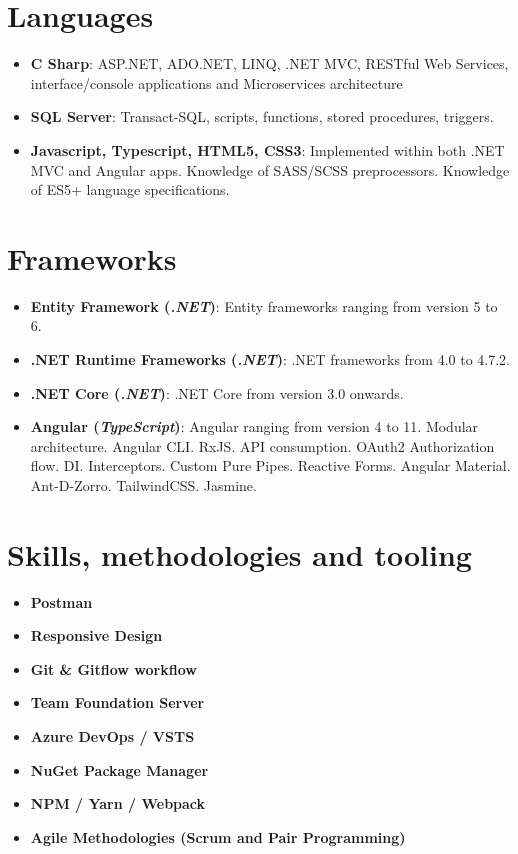\documentclass[letterpaper,11pt]{article}
\newcommand{\resumeItem}[2]{
  \item\small{
    \textbf{#1}{: #2 \vspace{-2pt}}
  }
}
\newcommand{\resumeItemItalic}[3]{
  \item\small{
    \textbf{#1 (\textit{#2})}{: #3 \vspace{-2pt}}
  }\vspace{-4pt}
}
\newcommand{\resumeItemAlign}[2]{
  \vspace{-1pt}\item\small{
    \textbf{#1} \hfill \textit{#2}
  }\vspace{-5pt}
}
\newcommand{\resumeSubHeadingListStart}{\begin{itemize}[leftmargin=*]}
\newcommand{\resumeSubHeadingListEnd}{\end{itemize}}
\begin{document}
\section{Languages}
\resumeSubHeadingListStart	
	\resumeItem{C Sharp} 
	{ASP.NET, ADO.NET, LINQ, .NET MVC, RESTful Web Services, interface/console applications and Microservices architecture}\\
	\resumeItem{SQL Server} 
	{Transact-SQL, scripts, functions, stored procedures, triggers.}\\
	\resumeItem{Javascript, Typescript, HTML5, CSS3}{Implemented within both .NET MVC and Angular apps. Knowledge of SASS/SCSS preprocessors. Knowledge of ES5+ language specifications.}
\resumeSubHeadingListEnd


\section{Frameworks}
\resumeSubHeadingListStart
  \resumeItemItalic{Entity Framework} {.NET}
    {Entity frameworks ranging from version 5 to 6.}
  \resumeItemItalic{.NET Runtime Frameworks}{.NET}
    {.NET frameworks from 4.0 to 4.7.2.}
\resumeItemItalic{.NET Core}{.NET}
    {.NET Core from version 3.0 onwards.}
  \resumeItemItalic{Angular}{TypeScript}
    {Angular ranging from version 4 to 11. Modular architecture. Angular CLI. RxJS. API consumption. OAuth2 Authorization flow. DI. Interceptors. Custom Pure Pipes. Reactive Forms.  Angular Material. Ant-D-Zorro. TailwindCSS. Jasmine.}
\resumeSubHeadingListEnd


\section{Skills,  methodologies and tooling}

\resumeSubHeadingListStart
	\resumeItemAlign{Postman}{}
	\resumeItemAlign{Responsive Design}{}
	\resumeItemAlign{Git \& Gitflow workflow}{}
	\resumeItemAlign{Team Foundation Server}{}
	\resumeItemAlign{Azure DevOps / VSTS}{}
	\resumeItemAlign{NuGet Package Manager}{}
	\resumeItemAlign{NPM / Yarn / Webpack}{}
	\resumeItemAlign{Agile Methodologies (Scrum and Pair Programming) }{}
\resumeSubHeadingListEnd
\end{document}
